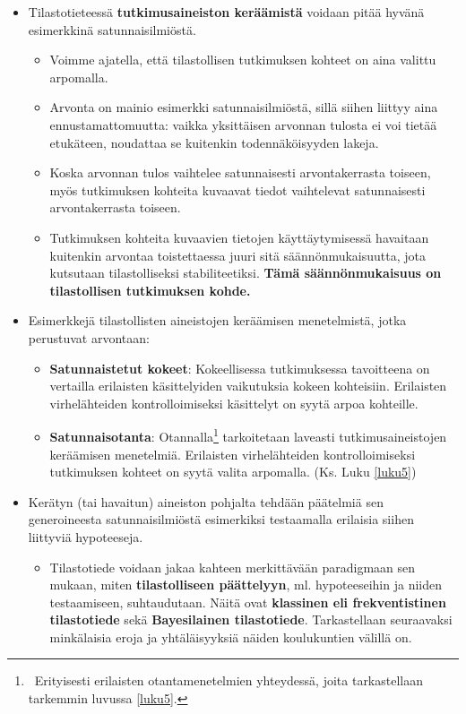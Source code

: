 \documentclass[
]{book}
\providecommand{\tightlist}{%
  \setlength{\itemsep}{0pt}\setlength{\parskip}{0pt}}
\begin{document}
\begin{itemize}
\tightlist
\item
  Tilastotieteessä \textbf{tutkimusaineiston keräämistä} voidaan pitää hyvänä esimerkkinä satunnaisilmiöstä.

  \begin{itemize}
  \tightlist
  \item
    Voimme ajatella, että tilastollisen tutkimuksen kohteet on aina valittu arpomalla.
  \item
    Arvonta on mainio esimerkki satunnaisilmiöstä, sillä siihen liittyy aina ennustamattomuutta: vaikka yksittäisen arvonnan tulosta ei voi tietää etukäteen, noudattaa se kuitenkin todennäköisyyden lakeja.
  \item
    Koska arvonnan tulos vaihtelee satunnaisesti arvontakerrasta toiseen, myös tutkimuksen kohteita kuvaavat tiedot vaihtelevat satunnaisesti arvontakerrasta toiseen.
  \item
    Tutkimuksen kohteita kuvaavien tietojen käyttäytymisessä havaitaan kuitenkin arvontaa toistettaessa juuri sitä säännönmukaisuutta, jota kutsutaan tilastolliseksi stabiliteetiksi. \textbf{Tämä säännönmukaisuus on tilastollisen tutkimuksen kohde.}
  \end{itemize}
\item
  Esimerkkejä tilastollisten aineistojen keräämisen menetelmistä, jotka perustuvat arvontaan:

  \begin{itemize}
  \tightlist
  \item
    \textbf{Satunnaistetut kokeet}: Kokeellisessa tutkimuksessa tavoitteena on vertailla erilaisten käsittelyiden vaikutuksia kokeen kohteisiin. Erilaisten virhelähteiden kontrolloimiseksi käsittelyt on syytä arpoa kohteille.
  \item
    \textbf{Satunnaisotanta}: Otannalla\footnote{~Erityisesti erilaisten otantamenetelmien yhteydessä, joita tarkastellaan tarkemmin luvussa \ref{luku5}.} tarkoitetaan laveasti tutkimusaineistojen keräämisen menetelmiä. Erilaisten virhelähteiden kontrolloimiseksi tutkimuksen kohteet on syytä valita arpomalla. (Ks. Luku \ref{luku5})
  \end{itemize}
\item
  Kerätyn (tai havaitun) aineiston pohjalta tehdään päätelmiä sen generoineesta satunnaisilmiöstä esimerkiksi testaamalla erilaisia siihen liittyviä hypoteeseja.

  \begin{itemize}
  \tightlist
  \item
    Tilastotiede voidaan jakaa kahteen merkittävään paradigmaan sen mukaan, miten \textbf{tilastolliseen päättelyyn}, ml. hypoteeseihin ja niiden testaamiseen, suhtaudutaan. Näitä ovat \textbf{klassinen eli frekventistinen tilastotiede} sekä \textbf{Bayesilainen tilastotiede}. Tarkastellaan seuraavaksi minkälaisia eroja ja yhtäläisyyksiä näiden koulukuntien välillä on.
  \end{itemize}
\end{itemize}
\end{document}
